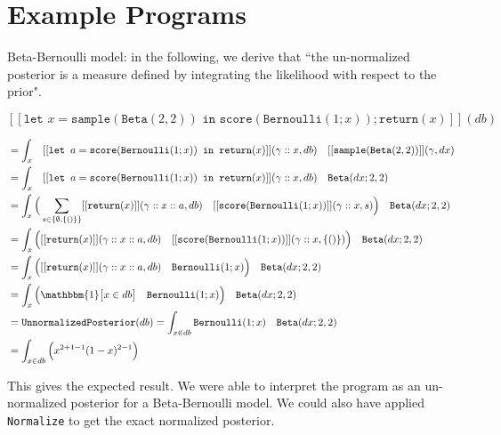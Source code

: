 \documentclass[11pt]{article}
\theoremstyle{definition}
\theoremstyle{plain}
\begin{document}
\newpage

\section{Example Programs}


\noindent Beta-Bernoulli model: in the following, we derive that ``the un-normalized posterior is a measure defined by integrating the likelihood with respect to the prior".

    $$[[\texttt{let } x = \texttt{sample}(\texttt{Beta}(2,2)) \texttt{ in score} (\texttt{Bernoulli}(1;x));\texttt{return}(x)]](db)$$

\begin{align*}
    &= \int_x \quad [[\texttt{let } a =\texttt{score}(\texttt{Bernoulli}(1;x)) \texttt{ in return}(x)]](\gamma::x, db) 
        \quad [[\texttt{sample}(\texttt{Beta}(2,2))]](\gamma,dx)\\
    &= \int_x \quad [[\texttt{let } a =\texttt{score}(\texttt{Bernoulli}(1;x)) \texttt{ in return}(x)]](\gamma::x, db) 
        \quad \texttt{Beta}(dx;2,2)\\
    &= \int_x 
        \Big( \sum_{s \in \{\emptyset,\{()\} \}} [[\texttt{return}(x)]](\gamma::x::a,db) \quad [[\texttt{score}(\texttt{Bernoulli}(1;x))]](\gamma::x,s) \Big)
        \quad \texttt{Beta}(dx;2,2)\\
    &= \int_x 
        \Big( [[\texttt{return}(x)]](\gamma::x::a,db) \quad [[\texttt{score}(\texttt{Bernoulli}(1;x))]](\gamma::x,\{()\}) \Big)
        \quad \texttt{Beta}(dx;2,2)\\
    &= \int_x 
        \Big( [[\texttt{return}(x)]](\gamma::x::a,db) \quad \texttt{Bernoulli}(1;x) \Big)
        \quad \texttt{Beta}(dx;2,2)\\
    &= \int_x 
        \Big(\mathbbm{1}\big[ x \in db \big] \quad \texttt{Bernoulli}(1;x) \Big)
        \quad \texttt{Beta}(dx;2,2)\\
    &= \texttt{UnnormalizedPosterior}(db) = \int_{x \in db} 
        \texttt{Bernoulli}(1;x) \quad \texttt{Beta}(dx;2,2)\\
        &= \int_{x \in db} \Big(x^{2 + 1 - 1}(1-x)^{2 - 1}\Big)
    \end{align*}

\noindent This gives the expected result. We were able to interpret the program as an un-normalized posterior for a Beta-Bernoulli model.
We could also have applied \texttt{Normalize} to get the exact normalized posterior.\\
\end{document}
